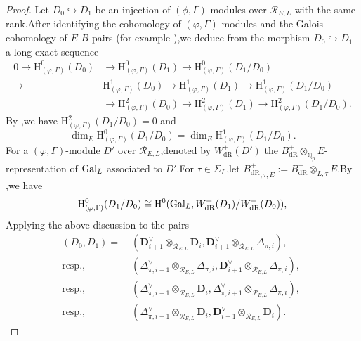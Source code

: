 \documentclass[SecEq,CM,GP]{degruyter-crelle} %
\theoremstyle{plain}
\newcommand{\bdr}{{B^+_{\mathrm{dR}}}}
\newcommand{\Dpik}{{\mathbf{D}}}
\newcommand{\gal}{{\rm Gal}}
\newcommand{\hH}{{\mathrm{H}}}
\newcommand{\tee}{{{\otimes}_{\cR_{E,L}}}}
\newcommand{\wdr}{{W^+_{\mathrm{dR}}}}
\newcommand{\BQ}{{\mathbb{Q}}}
\newcommand{\cR}{\mathcal R}
\begin{document}
\begin{proof}Let $D_0\hookrightarrow D_1$ be an injection of $(\phi,\Gamma)$-modules over $\cR_{E,L}$ with the same rank.\;After identifying the cohomology of $(\varphi,\Gamma)$-modules and the Galois cohomology of $E$-$B$-pairs (for example \cite[Section 3]{nakamura2009classification}),\;we deduce from the morphism $D_0\hookrightarrow D_1$ a long exact sequence 
\begin{equation}\label{isoIIIlong}
	\begin{aligned}
		0\longrightarrow   \hH^0_{(\varphi,\Gamma)}(D_0)&\longrightarrow
		\hH^0_{(\varphi,\Gamma)}(D_1)  \longrightarrow \hH^0_{(\varphi,\Gamma)}(D_1/D_0)\\
		\longrightarrow   &\hH^1_{(\varphi,\Gamma)}(D_0)\longrightarrow
		\hH^1_{(\varphi,\Gamma)}(D_1)  \longrightarrow \hH^1_{(\varphi,\Gamma)}(D_1/D_0)\\
		&\longrightarrow   \hH^2_{(\varphi,\Gamma)}(D_0)\longrightarrow
		\hH^2_{(\varphi,\Gamma)}(D_1)  \longrightarrow \hH^2_{(\varphi,\Gamma)}(D_1/D_0).
	\end{aligned}
\end{equation}
By \cite[Theorem 4.7]{liu2007cohomology},\;we have $\hH^2_{(\varphi,\Gamma)}(D_1/D_0)=0$ and 
\begin{equation}\label{equHIH2}
	\dim_E\hH^0_{(\varphi,\Gamma)}(D_1/D_0)=\dim_E\hH^1_{(\varphi,\Gamma)}(D_1/D_0).
\end{equation}
For a $(\varphi,\Gamma)$-module $D'$ over $\cR_{E,L}$,\;denoted by $\wdr(D')$ the $\bdr\otimes_{\BQ_p}E$-representation of $\gal_L$ associated to $D'$.\;For $\tau\in \Sigma_L$,\;let $\bdr_{,\tau,E}:=\bdr\otimes_{L,\tau} E$.\;By \cite[Lemma 5.1.1]{breuil2020probleme},\;we have
\begin{equation}\label{H0wdr}
	\hH^0_{(\varphi,\Gamma)}(D_1/D_0)\cong \hH^0(\gal_L,\wdr(D_1)/\wdr(D_0)),
\end{equation}
Applying the above discussion to the pairs
\begin{equation}
	\begin{aligned}
		(D_0,D_1)=&\;(\Dpik_{i+1}^\vee\tee\Dpik_{i},\Dpik_{i+1}^\vee\tee\Delta_{\pi,i}),\;\\
		\text{resp.,}&\;(\Delta_{\pi,i+1}^\vee\tee\Delta_{\pi,i},\Dpik_{i+1}^\vee\tee\Delta_{\pi,i}),\\
		\text{resp.,}&\;(\Delta_{\pi,i+1}^\vee\tee\Dpik_{i},\Delta_{\pi,i+1}^\vee\tee\Delta_{\pi,i}),\;\\
		\text{resp.,}&\;(\Delta_{\pi,i+1}^\vee\tee\Dpik_{i},\Dpik_{i+1}^\vee\tee\Dpik_{i}).\;

\end{aligned}
\end{equation}
\end{proof}
\end{document}
